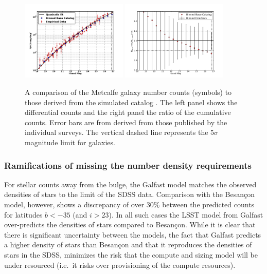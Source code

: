 \documentclass[11pt]{article}
\begin{document}
\begin{figure}[h]
\centering
\includegraphics[width=0.45\textwidth]{validation_figures/Ngals-i.png}
\hfil \includegraphics[width=0.45\textwidth]{validation_figures/CumulativeFraction_i.png}
\caption{A comparison of the Metcalfe galaxy number counts (symbols)
  to those derived from the simulated catalog \label{fig:gcounts}. The
  left panel shows the differential counts and the right panel the
  ratio of the cumulative counts. Error bars are from derived from
  those published by the individual surveys. \label{fig:gratio}
The vertical dashed line represents the
  5$\sigma$ magnitude limit for galaxies.}
\end{figure}

\subsubsection{Ramifications of missing the number density requirements}

For stellar counts away from the bulge, the Galfast model matches the
observed densities of stars to the limit of the SDSS data. Comparison
with the Besan\c{c}on model, however, shows a discrepancy of over 30\%
between the predicted counts for latitudes $b<-35$ (and $i>23$).  In
all such cases the LSST model from Galfast over-predicts the densities
of stars compared to Besan\c{c}on. While it is clear that there is
significant uncertainty between the models, the fact that Galfast
predicts a higher density of stars than Besan\c{c}on and that it
reproduces the densities of stars in the SDSS, minimizes the risk that
the compute and sizing model will be under resourced (i.e.\ it risks
over provisioning of the compute resources).
\end{document}
